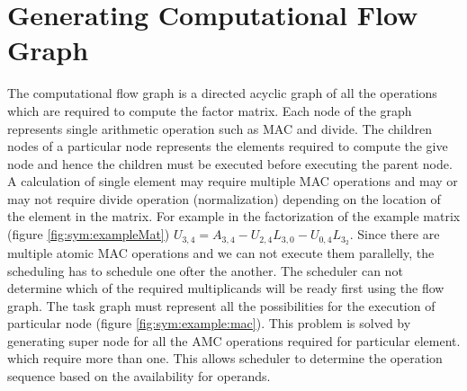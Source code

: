 \section{Generating Computational Flow Graph}

The computational flow graph is a directed acyclic graph of all the operations
which are required to compute the factor matrix. Each node of the graph represents
single arithmetic operation such as MAC and divide. The children nodes of a particular
node represents the elements required to compute the give node and hence the children
must be executed before executing the parent node. A calculation of single element
may require multiple MAC operations and may or may not require divide operation (normalization) depending
on the location of the element in the matrix. For example in the factorization of the example matrix 
(figure \ref{fig:sym:exampleMat})
$U_{3,4} = A_{3,4} - U_{2,4}L_{3,0} - U_{0,4}L_{3_2}$. Since there are multiple 
atomic MAC operations and we can not execute them parallelly, the scheduling has to schedule one ofter the another.
The scheduler can not determine which of the required multiplicands will be ready first using the flow graph.
The task graph must represent all the possibilities for the execution of particular node (figure \ref{fig:sym:example:mac}). This
problem is solved by generating super node for all the AMC operations required for particular element. 
which require more than one. This allows scheduler to determine the operation sequence 
based on the availability for operands.


